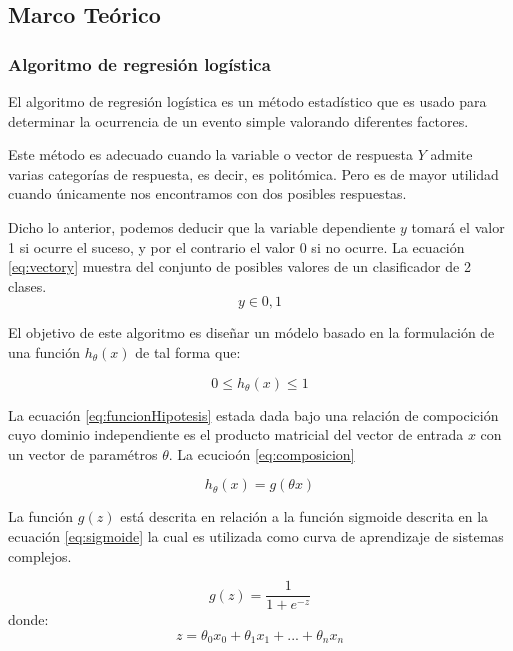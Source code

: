 \subsection{Marco Te\'orico}
\subsubsection{Algoritmo de regresi\'on log\'istica}

El algoritmo de regresi\'on log\'istica es un m\'etodo estad\'istico que es usado para determinar la ocurrencia de un evento simple valorando diferentes factores.  

Este m\'etodo es adecuado cuando la variable o vector de respuesta $Y$ admite varias categor\'ias de respuesta, es decir, es polit\'omica. Pero es de mayor utilidad cuando \'unicamente nos encontramos con dos posibles respuestas.

Dicho lo anterior, podemos deducir que la variable dependiente $y$ tomar\'a el valor 1 si ocurre el suceso, y por el contrario el valor 0 si no ocurre. La ecuaci\'on \ref{eq:vectory} muestra del conjunto de posibles valores de un clasificador de 2 clases.
\begin{equation}\label{eq:vectory}
y \in {0,1}
\end{equation}

El objetivo de este algoritmo es dise\~nar un m\'odelo basado en la formulaci\'on de una funci\'on $h_{\theta}(x)$ de tal forma que:

\begin{equation}\label{eq:funcionHipotesis}
0 \leq h_{\theta}(x) \leq 1
\end{equation}

La ecuaci\'on \ref{eq:funcionHipotesis} estada dada bajo una relaci\'on de compocici\'on cuyo dominio independiente es el producto matricial del vector de entrada $x$ con un vector de param\'etros $\theta$. La ecucio\'on \ref{eq:composicion}

\begin{equation}\label{eq:composicion}
h_{\theta}(x) = g(\theta x)
\end{equation}

La funci\'on $g(z)$ est\'a descrita en relaci\'on a la funci\'on sigmoide descrita en la ecuaci\'on \ref{eq:sigmoide} la cual es utilizada como curva de aprendizaje de sistemas complejos.


\begin{equation}\label{eq:sigmoide}
g(z) = \frac{1}{1+e^{-z}}
\end{equation}
donde:
\begin{equation}
z = \theta_{0}x_{0}+ \theta_{1}x_{1} + ... +  \theta_{n}x_{n}
\end{equation}


